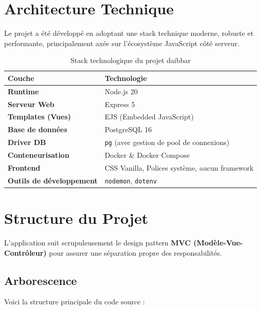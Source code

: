 \documentclass[12pt,a4paper]{article}
\begin{document}
\section{Architecture Technique}

Le projet a été développé en adoptant une stack technique moderne, robuste et performante, principalement axée sur l'écosystème JavaScript côté serveur.

\begin{table}[h]
\centering
\begin{tabularx}{\textwidth}{|l|X|}
\hline
\textbf{Couche} & \textbf{Technologie} \\ \hline
\textbf{Runtime} & Node.js 20 \\ \hline
\textbf{Serveur Web} & Express 5 \\ \hline
\textbf{Templates (Vues)} & EJS (Embedded JavaScript) \\ \hline
\textbf{Base de données} & PostgreSQL 16 \\ \hline
\textbf{Driver DB} & \texttt{pg} (avec gestion de pool de connexions) \\ \hline
\textbf{Conteneurisation} & Docker \& Docker Compose \\ \hline
\textbf{Frontend} & CSS Vanilla, Polices système, aucun framework \\ \hline
\textbf{Outils de développement} & \texttt{nodemon}, \texttt{dotenv} \\ \hline
\end{tabularx}
\caption{Stack technologique du projet daibbar}
\end{table}

\section{Structure du Projet}

L'application suit scrupuleusement le design pattern \textbf{MVC (Modèle-Vue-Contrôleur)} pour assurer une séparation propre des responsabilités.

\subsection{Arborescence}
Voici la structure principale du code source :
\end{document}
